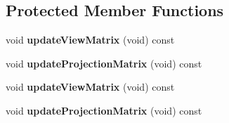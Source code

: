 \subsection*{Protected Member Functions}
\begin{DoxyCompactItemize}
\item 
\mbox{\label{class_camera_a3aa2a49c68b8d2e70e22dfb870f0921c}} 
void {\bfseries update\+View\+Matrix} (void) const
\item 
\mbox{\label{class_camera_a0d31ec301bed986e1a8db01c8a8ef9d7}} 
void {\bfseries update\+Projection\+Matrix} (void) const
\item 
\mbox{\label{class_camera_a3aa2a49c68b8d2e70e22dfb870f0921c}} 
void {\bfseries update\+View\+Matrix} (void) const
\item 
\mbox{\label{class_camera_a0d31ec301bed986e1a8db01c8a8ef9d7}} 
void {\bfseries update\+Projection\+Matrix} (void) const
\end{DoxyCompactItemize}
